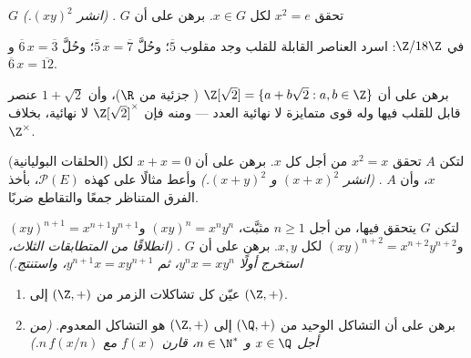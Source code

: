 \begin{exercise}[$\star\star$]\label{exo:b1:structures:7}
 $G$ تحقق $x^2 = e$ لكل $x \in G$. برهن على أن $G$
. \emph{(انشر $(xy)^2$.)}
\end{exercise}

\begin{exercise}[$\star\star$]\label{exo:b1:structures:8}
في $\Z/18\Z$: اسرد العناصر القابلة للقلب وجد مقلوب $\overline 5$؛
وحُلَّ $\overline 5\, x = \overline 7$؛ وحُلَّ $\overline 6\, x =
\overline 3$ و$\overline 6\, x = \overline{12}$.
\end{exercise}

\begin{exercise}[$\star\star$]\label{exo:b1:structures:9}
برهن على أن  $\Z[\sqrt 2] = \{a + b\sqrt 2 : a, b \in \Z\}$
 ( جزئية من $\R$)، وأن $1 + \sqrt 2$ عنصر قابل للقلب فيها
وله قوى متمايزة لا نهائية العدد --- ومنه فإن $\Z[\sqrt 2]^\times$
لا نهائية، بخلاف $\Z^\times$.
\end{exercise}

\begin{exercise}[$\star\star\star$]\label{exo:b1:structures:10}
(الحلقات البوليانية) لتكن $A$  تحقق $x^2 = x$ من أجل كل $x$.
برهن على أن $x + x = 0$ لكل $x$، وأن $A$ .
\emph{(انشر $(x+x)^2$ و $(x+y)^2$.)} وأعط مثالًا على 
كهذه  $\mathcal{P}(E)$، بأخذ الفرق المتناظر
جمعًا والتقاطع ضربًا.
\end{exercise}

\begin{exercise}[$\star\star\star$]\label{exo:b1:structures:11}
لتكن $G$  يتحقق فيها، من أجل $n \geq 1$ مثبَّت، $(xy)^n =
x^n y^n$ و$(xy)^{n+1} = x^{n+1}y^{n+1}$ و$(xy)^{n+2} =
x^{n+2}y^{n+2}$ لكل $x, y$. برهن على أن $G$ .
\emph{(انطلاقًا من المتطابقات الثلاث، استخرج أولًا $y^n x = x y^n$، ثم
$y^{n+1} x = x y^{n+1}$، واستنتج.)}
\end{exercise}

\begin{exercise}[$\star\star$]\label{exo:b1:structures:12}
\begin{enumerate}
  \item عيّن كل تشاكلات الزمر من $(\Z, +)$ إلى $(\Z, +)$.
  \item برهن على أن التشاكل الوحيد من $(\Q, +)$ إلى
        $(\Z, +)$ هو التشاكل المعدوم. \emph{(من أجل $x \in \Q$ و
        $n \in \N^*$، قارن $f(x)$ مع $n\,f(x/n)$.)}
\end{enumerate}
\end{exercise}

